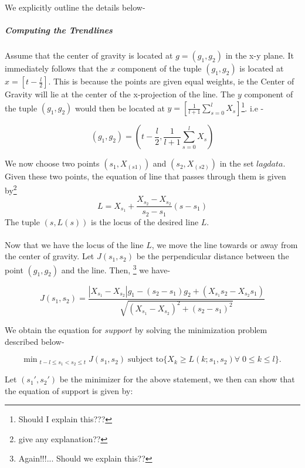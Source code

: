 \documentclass[letterpaper, 12pt] {article}
\begin{document}
	We explicitly outline the details below- \pagebreak
	
	\subparagraph{Computing the Trendlines}
	Assume that the center of gravity is located at $g = (g_1, g_2)$ in the x-y plane. It immediately follows that the $x$ component of the tuple $(g_1, g_2)$ is located at $x = [t - \frac{l}{2}]$. This is because the points are given equal weights, ie the Center of Gravity will lie at the center of the x-projection of the line. The $y$ component of the tuple $(g_1, g_2)$ would then be located at $y = [\frac{1}{l+1}\sum_{s=0}^{l} X_s ]$\footnote{Should I explain this???}. i.e -
	
	\begin{equation*}
	(g_1, g_2) = (t - \frac{l}{2}, \frac{1}{l+1}\sum_{s=0}^{l} X_s )
	\end{equation*}
	
	We now choose two points $(s_1, X_(s1))$ and $(s_2, X_(s2))$ in the set $lagdata$. Given these two points, the equation of line that passes through them is given by\footnote{give any explanation??} 
	$$L = X_{s_1} + \frac{X_{s_2} - X_{s_2}}{s_2 - s_1}(s - s_1)$$ 
	The tuple $(s, L(s))$ is the locus of the desired line $L$. 
	
	\paragraph{}
	Now that we have the locus of the line $L$, we move the line towards or away from the center of gravity. Let $J(s_1, s_2)$ be the perpendicular distance between the point $(g_1, g_2)$ and the line. Then, \footnote{\label{note9}Again!!!... Should we explain this??} we have-
	
	\begin{equation*}
	J(s_1, s_2) = \frac{|X_{s_1} - X_{s_2}|g_1- (s_2-s_1)g_2 +(X_{s_1}s_2 - X_{s_2}s_1)}{\sqrt{(X_{s_1} - X_{s_2})^2 + (s_2 - s_1)^2}}
	\end{equation*}
	
	We obtain the equation for $support$ by solving the minimization problem described below-
	
	\begin{equation*}
	\text{min}\;_{{t-l}\leq {s_1} < {s_2} \leq t} \; J(s_1, s_2) \; \text{subject to} \{X_k \geq L(k; s_1, s_2) \forall \; 0 \leq k \leq l\}. 
	\end{equation*}
	
	Let $(s_1', s_2')$ be the minimizer for the above statement, we then can show that the equation of support is given by:
	
\end{document}
